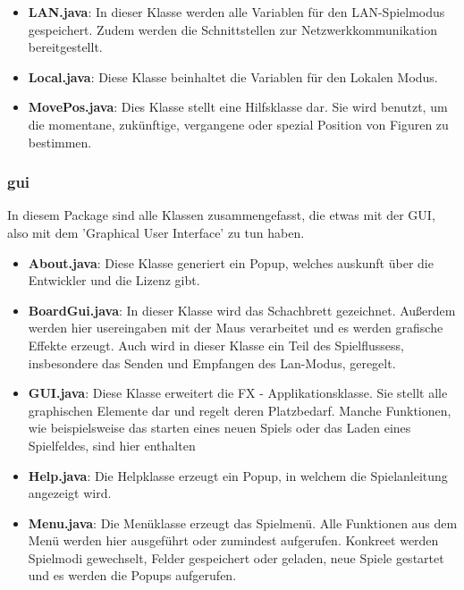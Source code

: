 \documentclass[12pt,a4paper]{article}
\begin{document}
{\begin{itemize}
	\item{\textbf{LAN.java}: In dieser Klasse werden alle Variablen für den LAN-Spielmodus gespeichert. Zudem werden die Schnittstellen zur Netzwerkkommunikation bereitgestellt.}
	
	\item{\textbf{Local.java}: Diese Klasse beinhaltet die Variablen für den Lokalen Modus. }

	\item{\textbf{MovePos.java}: Dies Klasse stellt eine Hilfsklasse dar. Sie wird benutzt, um die momentane, zukünftige, vergangene oder spezial Position von Figuren zu bestimmen.}

\end{itemize}

\subsubsection{gui}

In diesem Package sind alle Klassen zusammengefasst, die etwas mit der GUI, also mit dem 'Graphical User Interface' zu tun haben. 

\begin{itemize}

	\item{\textbf{About.java}: Diese Klasse generiert ein Popup, welches auskunft über die Entwickler und die Lizenz gibt. }
	
	\item{\textbf{BoardGui.java}: In dieser Klasse wird das Schachbrett gezeichnet. Außerdem werden hier usereingaben mit der Maus verarbeitet und es werden grafische Effekte erzeugt. Auch wird in dieser Klasse ein Teil des Spielflussess, insbesondere das Senden und Empfangen des Lan-Modus, geregelt. }
	
	\item{\textbf{GUI.java}: Diese Klasse erweitert die FX - Applikationsklasse. Sie stellt alle graphischen Elemente dar und regelt deren Platzbedarf. Manche Funktionen, wie beispielsweise das starten eines neuen Spiels oder das Laden eines Spielfeldes, sind hier enthalten }
	
	\item{\textbf{Help.java}: Die Helpklasse erzeugt ein Popup, in welchem die Spielanleitung angezeigt wird.}
	
	\item{\textbf{Menu.java}: Die Menüklasse erzeugt das Spielmenü. Alle Funktionen aus dem Menü werden hier ausgeführt oder zumindest aufgerufen. Konkreet werden Spielmodi gewechselt, Felder gespeichert oder geladen, neue Spiele gestartet und es werden die Popups aufgerufen.}
	

\end{itemize}}
\end{document}
